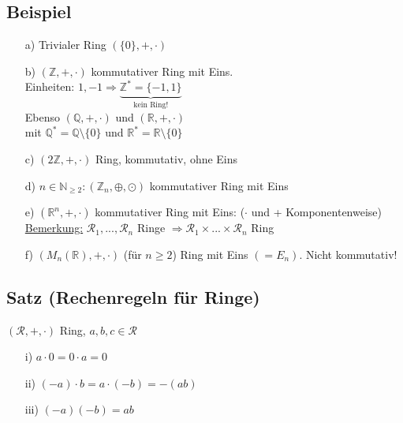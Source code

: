 \documentclass[12pt,titlepage, pdf]{article}
\newcommand{\R}{\mathds{R}}
\newcommand{\uline}[1]{\underline{#1}}
\renewcommand{\>}{\rightarrow}
\renewcommand{\*}{\cdot}
\begin{document}
	      \subsection{Beispiel}
	      \label{4.2}
	      \begin{itemize}
	      	\item[a)] Trivialer Ring $(\{0\},+,\cdot)$
	      	\item[b)] $(\mathds{Z}, +,\cdot)$ kommutativer Ring mit Eins. \\
	      	      Einheiten: $1, -1\Rightarrow \underbrace{\mathds{Z}^* = \{-1,1\}}_{\text{kein Ring!}}$\\
	      	      Ebenso $(\mathds{Q},+,\cdot)$ und $(\mathds{R},+,\cdot)$ \\
	      	      mit $\mathds{Q}^* = \mathds{Q} \setminus \{0\}$ und $\mathds{R}^* =  \mathds{R} \setminus \{0\}$
	      	\item[c)] $(2\mathds{Z},+,\cdot)$ Ring, kommutativ, ohne Eins
	      	\item[d)] $n \in \mathds{N}_{\geq 2}: (\mathds{Z}_n, \oplus, \odot)$ kommutativer Ring mit Eins
	      	\item[e)] $(\R^n, + ,\cdot)$ kommutativer Ring mit Eins: ($\cdot$ und + Komponentenweise)\\
	      	      \uline{Bemerkung:} $\mathcal{R}_1,...,\mathcal{R}_n$ Ringe $\Rightarrow \mathcal{R}_1 \times ... \times \mathcal{R}_n$ Ring
	      	\item[f)] $(M_n(\R),+, \cdot)$ (für $n\geq 2$) Ring mit Eins $(= E_n)$. Nicht kommutativ! 
	      \end{itemize}
	      \subsection{Satz (Rechenregeln für Ringe)}
	      \label{4.3}
	      $(\mathcal{R}, +,\cdot)$ Ring, $a,b,c \in \mathcal{R}$
	      \begin{itemize}
	      	\item[i)] $a \cdot 0 = 0 \cdot a = 0$
	      	\item[ii)] $(-a) \cdot b = a \cdot (-b) = -(ab)$
	      	\item[iii)] $(-a)(-b) = ab$
	      \end{itemize}	
\end{document}
